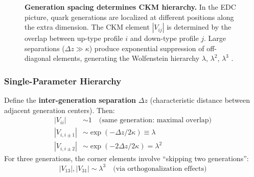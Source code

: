 \begin{figure}[htbp]
\centering
{}
\caption{\textbf{Generation spacing determines CKM hierarchy.}
In the EDC picture, quark generations are localized at different positions along
the extra dimension. The CKM element $|V_{ij}|$ is determined by the overlap
between up-type profile $i$ and down-type profile $j$. Large separations
($\Delta z \gg \kappa$) produce exponential suppression of off-diagonal
elements, generating the Wolfenstein hierarchy $\lambda$, $\lambda^2$, $\lambda^3$
\tagDc{}.}
\label{fig:ch7_generation_spacing}
\end{figure}

\subsubsection{Single-Parameter Hierarchy}

\begin{tcolorbox}[colback=blue!5, colframe=blue!50!black,
    title=\textbf{The Wolfenstein Mechanism}]
Define the \textbf{inter-generation separation} $\Delta z$ (characteristic
distance between adjacent generation centers). Then:
\begin{align}
    |V_{ii}| &\sim 1 \quad\text{(same generation: maximal overlap)}
    \label{eq:ch7_diag} \\
    |V_{i,i\pm 1}| &\sim \exp(-\Delta z/2\kappa) \equiv \lambda
    \label{eq:ch7_offdiag1} \\
    |V_{i,i\pm 2}| &\sim \exp(-2\Delta z/2\kappa) = \lambda^2
    \label{eq:ch7_offdiag2}
\end{align}
For three generations, the corner elements involve ``skipping two generations'':
\begin{equation}
    |V_{13}|, |V_{31}| \sim \lambda^3 \quad\text{(via orthogonalization effects)}
    \label{eq:ch7_corner}
\end{equation}
\end{tcolorbox}

